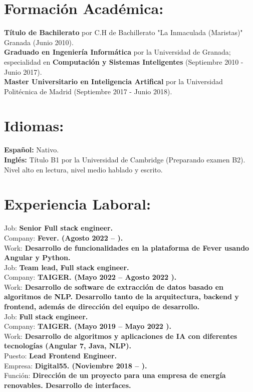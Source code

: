 \documentclass	[10pt,a4paper,oneside]{article}
\newcommand{\seccion}[1]{\vspace*{3mm}\section*{#1}\vspace*{-3mm}}
\begin{document}
\seccion{Formación Acad\'emica:}
\textbf{Título de Bachilerato} por C.H de Bachillerato "La Inmaculada (Maristas)" Granada (Junio 2010).\\
\textbf{Graduado en Ingenier\'ia Inform\'atica} por la Universidad de Granada;
especialidad en \textbf{Computación y Sistemas Inteligentes} (Septiembre 2010 - Junio 2017).\\
\textbf{Master Universitario en Inteligencia Artifical} por la Universidad Politécnica de Madrid (Septiembre 2017 - Junio 2018).\\


\seccion{Idiomas:}
\textbf{Español:} Nativo.\\
\textbf{Inglés:} Título B1 por la Universidad de Cambridge (Preparando examen B2). Nivel alto en lectura, nivel medio hablado y escrito.\\



\seccion{Experiencia Laboral:}

Job: \textbf{Senior Full stack engineer.}\\
Company: \textbf{Fever. (Agosto 2022 –  ).}\\
Work: \textbf{Desarrollo de funcionalidades en la plataforma de Fever usando Angular y Python.}\\

Job: \textbf{Team lead, Full stack engineer.}\\
Company: \textbf{TAIGER. (Mayo 2022 – Agosto 2022 ).}\\
Work: \textbf{Desarrollo de software de extracción de datos basado en algoritmos de NLP. Desarrollo tanto de la arquitectura, backend y frontend, además de dirección del equipo de desarrollo.}\\

Job: \textbf{Full stack engineer.}\\
Company: \textbf{TAIGER. (Mayo 2019 – Mayo 2022 ).}\\
Work: \textbf{Desarrollo de algoritmos y aplicaciones de IA con diferentes tecnologías (Angular 7, Java, NLP).}\\

Puesto: \textbf{Lead Frontend Engineer.}\\
Empresa: \textbf{Digital55. (Noviembre 2018 – ).}\\
Función: \textbf{Dirección de un proyecto para una empresa de energía renovables. Desarrollo de interfaces.}\\
\end{document}
